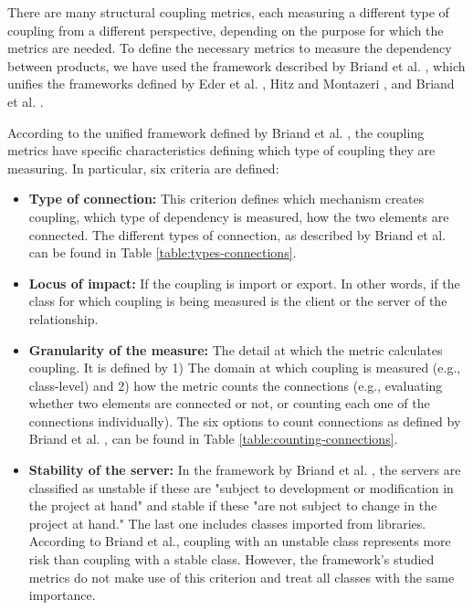 There are many structural coupling metrics, each measuring a different type of coupling from a different perspective, depending on the purpose for which the metrics are needed. To define the necessary metrics to measure the dependency between products, we have used the framework described by Briand et al. \cite{briand1999unified}, which unifies the frameworks defined by Eder et al. \cite{eder1994coupling}, Hitz and Montazeri \cite{hitz1995measuring}, and Briand et al. \cite{briand1997investigation}.

According to the unified framework defined by Briand et al. \cite{briand1999unified}, the coupling metrics have specific characteristics defining which type of coupling they are measuring. In particular, six criteria are defined:

\begin{itemize}
  \item \textbf{Type of connection:} This criterion defines which mechanism creates coupling, which type of dependency is measured, how the two elements are connected. The different types of connection, as described by Briand et al. \cite{briand1999unified} can be found in Table \ref{table:types-connections}.

  \item \textbf{Locus of impact:} If the coupling is import or export. In other words, if the class for which coupling is being measured is the client or the server of the relationship.

  \item \textbf{Granularity of the measure:} The detail at which the metric calculates coupling. It is defined by 1) The domain at which coupling is measured (e.g., class-level) and 2) how the metric counts the connections (e.g., evaluating whether two elements are connected or not, or counting each one of the connections individually). The six options to count connections as defined by Briand et al. \cite{briand1999unified}, can be found in Table \ref{table:counting-connections}.

  \item \textbf{Stability of the server:} In the framework by Briand et al. \cite{briand1999unified}, the servers are classified as unstable if these are  "subject to development or modification in the project at hand" and stable if these "are not subject to change in the project at hand." The last one includes classes imported from libraries. According to Briand et al., coupling with an unstable class represents more risk than coupling with a stable class. However, the framework's studied metrics do not make use of this criterion and treat all classes with the same importance.


\end{itemize}
